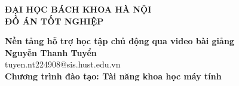 \documentclass[DoAn.tex]{subfiles}
\begin{document}
\begin{titlepage}
\thispagestyle{empty}
\begin{center}

{\textbf{\large{ĐẠI HỌC BÁCH KHOA HÀ NỘI}}}\\[4cm]

{\textbf{\huge{ ĐỒ ÁN TỐT NGHIỆP}}}\\[1cm]
{\textbf{\Large{Nền tảng hỗ trợ học tập chủ động qua video bài giảng
}}\\[1cm]

{\textbf{\large{Nguyễn Thanh Tuyển}}}\\
{\large{tuyen.nt224908@sis.hust.edu.vn}}\\[0.5cm]

{\textbf{\large{Chương trình đào tạo: Tài năng khoa học máy tính
}}}\\

\vspace{4cm}
\begin{table}[H]
\centering
{}
\end{table}}
\end{center}



\end{titlepage}
\end{document}
